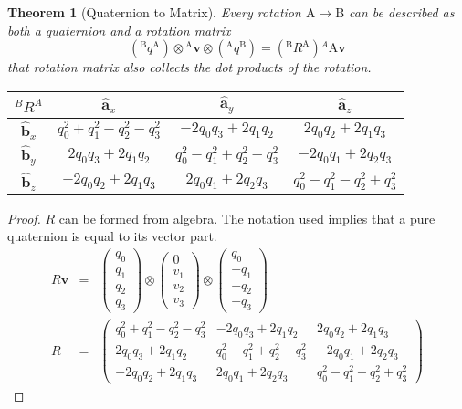 \documentclass{amsart}
\newtheorem{theorem}{Theorem}[section]
\theoremstyle{definition}
\theoremstyle{remark}
\numberwithin{equation}{section}
\begin{document}
\begin{theorem}[Quaternion to Matrix]
  Every rotation $\mathrm{A}\to\mathrm{B}$ can be described as both a quaternion and a rotation matrix
  \begin{equation}
    \left({^\mathrm{B}q^\mathrm{A}}\right) \otimes {^\mathrm{A}\mathbf{v}} \otimes \left({^\mathrm{A}q^\mathrm{B}}\right) = \left({^\mathrm{B}R^\mathrm{A}}\right){^A\mathrm{A}\mathbf{v}}
  \end{equation}
  that rotation matrix also collects the dot products of the rotation.
  
  \begin{tabular}{c|ccc}
    ${^BR^A}$ & $\hat{\mathbf{a}}_x$ & $\hat{\mathbf{a}}_y$ & $\hat{\mathbf{a}}_z$ \\
    \hline
    $\hat{\mathbf{b}}_x$ & $q_0^2+q_1^2-q_2^2-q_3^2$ & $-2q_0q_3+2q_1q_2$ & $2q_0q_2 + 2q_1q_3$ \\
    $\hat{\mathbf{b}}_y$ & $2q_0q_3+2q_1q_2$ & $q_0^2-q_1^2+q_2^2-q_3^2$ &  $-2q_0q_1 + 2q_2q_3$ \\
    $\hat{\mathbf{b}}_z$ & $-2q_0q_2+2q_1q_3$ & $2q_0q_1+2q_2q_3$ & $q_0^2-q_1^2-q_2^2+q_3^2$
  \end{tabular}\centering
\end{theorem}
\begin{proof}
  $R$ can be formed from algebra. The notation used implies that a pure quaternion is equal to its vector part.
  \begin{eqnarray}
    R \mathbf{v} &=&
    \begin{pmatrix}
      q_0 \\
      q_1 \\
      q_2 \\
      q_3
    \end{pmatrix} \otimes
    \begin{pmatrix}
      0 \\
      v_1 \\
      v_2 \\
      v_3 
    \end{pmatrix} \otimes
    \begin{pmatrix}
      q_0 \\
      -q_1 \\
      -q_2 \\
      -q_3
    \end{pmatrix} \nonumber \\
    R &=&
    \begin{pmatrix}
      q_0^2+q_1^2-q_2^2-q_3^2 & -2q_0q_3+2q_1q_2 & 2q_0q_2 + 2q_1q_3 \\
      2q_0q_3+2q_1q_2 & q_0^2-q_1^2+q_2^2-q_3^2 &  -2q_0q_1 + 2q_2q_3 \\
      -2q_0q_2+2q_1q_3 & 2q_0q_1+2q_2q_3 & q_0^2-q_1^2-q_2^2+q_3^2
    \end{pmatrix}
  \end{eqnarray} 
\end{proof}
\end{document}
